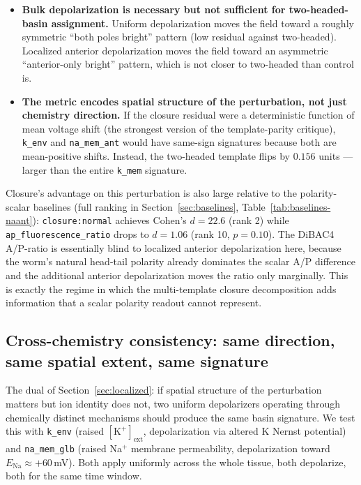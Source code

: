 \documentclass[11pt,a4paper]{article}
\begin{document}
\begin{itemize}\itemsep0pt
\item \textbf{Bulk depolarization is necessary but not sufficient for two-headed-basin assignment.} Uniform depolarization moves the field toward a roughly symmetric ``both poles bright'' pattern (low residual against two-headed). Localized anterior depolarization moves the field toward an asymmetric ``anterior-only bright'' pattern, which is not closer to two-headed than control is.
\item \textbf{The metric encodes spatial structure of the perturbation, not just chemistry direction.} If the closure residual were a deterministic function of mean voltage shift (the strongest version of the template-parity critique), \texttt{k\_env} and \texttt{na\_mem\_ant} would have same-sign signatures because both are mean-positive shifts. Instead, the two-headed template flips by $0.156$ units --- larger than the entire \texttt{k\_mem} signature.
\end{itemize}

Closure's advantage on this perturbation is also large relative to the polarity-scalar baselines (full ranking in Section~\ref{sec:baselines}, Table~\ref{tab:baselines-naant}): \texttt{closure:normal} achieves Cohen's $d=22.6$ (rank 2) while \texttt{ap\_fluorescence\_ratio} drops to $d=1.06$ (rank 10, $p=0.10$). The DiBAC4 A/P-ratio is essentially blind to localized anterior depolarization here, because the worm's natural head-tail polarity already dominates the scalar A/P difference and the additional anterior depolarization moves the ratio only marginally. This is exactly the regime in which the multi-template closure decomposition adds information that a scalar polarity readout cannot represent.

\subsection{Cross-chemistry consistency: same direction, same spatial extent, same signature}\label{sec:cross-chem}

The dual of Section~\ref{sec:localized}: if spatial structure of the perturbation matters but ion identity does not, two uniform depolarizers operating through chemically distinct mechanisms should produce the same basin signature. We test this with \texttt{k\_env} (raised $[\mathrm{K}^{+}]_{\mathrm{ext}}$, depolarization via altered K Nernst potential) and \texttt{na\_mem\_glb} (raised Na$^{+}$ membrane permeability, depolarization toward $E_{\mathrm{Na}}\approx +60$\,mV). Both apply uniformly across the whole tissue, both depolarize, both for the same time window.
\end{document}
